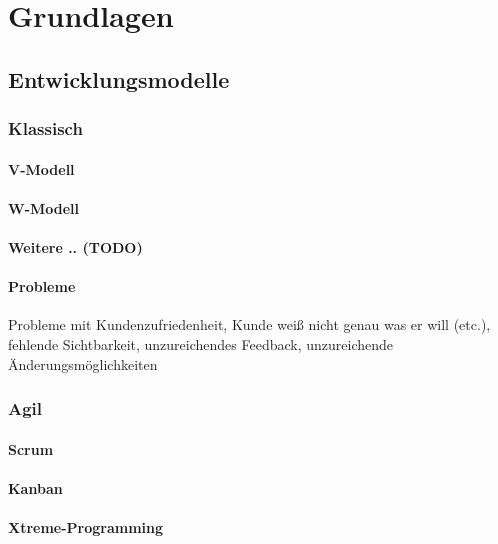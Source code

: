 \chapter{Grundlagen}

\section{Entwicklungsmodelle}

\subsection{Klassisch}

\subsubsection{V-Modell}

\subsubsection{W-Modell}

\subsubsection{Weitere .. (TODO)}

\subsubsection{Probleme}

Probleme mit Kundenzufriedenheit, Kunde weiß nicht genau was er will (etc.),
fehlende Sichtbarkeit, unzureichendes Feedback, unzureichende Änderungsmöglichkeiten

\subsection{Agil}

\subsubsection{Scrum}

\subsubsection{Kanban}

\subsubsection{Xtreme-Programming}

